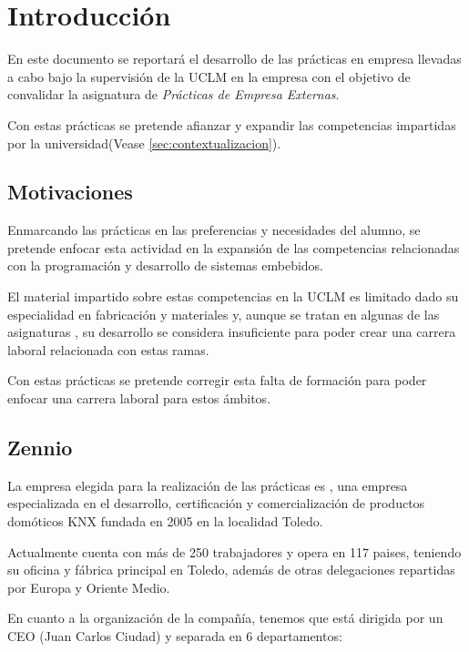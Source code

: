 \chapter{Introducción} 
\label{ch:introduccion}

\makeatletter
En este documento se reportará el desarrollo de las prácticas en empresa llevadas a cabo bajo la supervisión de la UCLM
en la empresa \@business con el objetivo de convalidar la asignatura de \emph{Prácticas de Empresa Externas}.

Con estas prácticas se pretende afianzar y expandir las competencias impartidas por la universidad(Vease \ref{sec:contextualizacion}).



\section{Motivaciones}
\label{sec:motivaciones}

Enmarcando las prácticas en las preferencias y necesidades del alumno, se pretende enfocar esta actividad en la expansión de las competencias relacionadas con la programación y desarrollo de sistemas embebidos.

El material impartido sobre estas competencias en la UCLM es limitado dado su especialidad en fabricación y materiales y, aunque se tratan en algunas de las asignaturas \cite{deCastilla-LaMancha2024Sep}, su desarrollo se considera insuficiente para poder crear una carrera laboral relacionada con estas ramas.

Con estas prácticas se pretende corregir esta falta de formación para poder enfocar una carrera laboral para estos ámbitos.

\section{Zennio}
\label{sec:zennio}

La empresa elegida para la realización de las prácticas es \@business, una empresa especializada en el desarrollo, certificación y comercialización de productos domóticos KNX fundada en 2005 en la localidad Toledo.

Actualmente cuenta con más de 250 trabajadores y opera en 117 paises, teniendo su oficina y fábrica principal en Toledo, además de otras delegaciones repartidas por Europa y Oriente Medio.

En cuanto a la organización de la compañía, tenemos que está dirigida por un CEO (Juan Carlos Ciudad) y separada en 6 departamentos:

